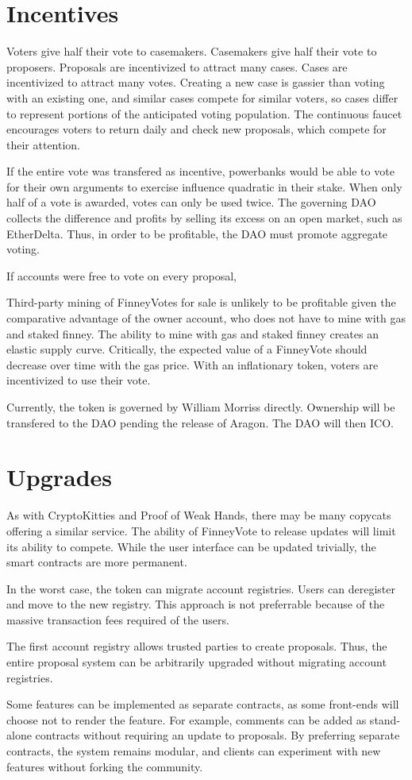 \documentclass{article}
\begin{document}
\section{Incentives}
Voters give half their vote to casemakers.
Casemakers give half their vote to proposers.
Proposals are incentivized to attract many cases.
Cases are incentivized to attract many votes.
Creating a new case is gassier than voting with an existing one, and similar cases compete for similar voters, so cases differ to represent portions of the anticipated voting population.
The continuous faucet encourages voters to return daily and check new proposals, which compete for their attention.
\par
If the entire vote was transfered as incentive, powerbanks would be able to vote for their own arguments to exercise influence quadratic in their stake.
When only half of a vote is awarded, votes can only be used twice.
The governing DAO collects the difference and profits by selling its excess on an open market, such as EtherDelta.
Thus, in order to be profitable, the DAO must promote aggregate voting.
\par
If accounts were free to vote on every proposal, 
\par
Third-party mining of FinneyVotes for sale is unlikely to be profitable given the comparative advantage of the owner account, who does not have to mine with gas and staked finney.
The ability to mine with gas and staked finney creates an elastic supply curve.
Critically, the expected value of a FinneyVote should decrease over time with the gas price.
With an inflationary token, voters are incentivized to use their vote.
\par
Currently, the token is governed by William Morriss directly.
Ownership will be transfered to the DAO pending the release of Aragon.
The DAO will then ICO.
\section{Upgrades}
As with CryptoKitties and Proof of Weak Hands, there may be many copycats offering a similar service.
The ability of FinneyVote to release updates will limit its ability to compete.
While the user interface can be updated trivially, the smart contracts are more permanent.
\par
In the worst case, the token can migrate account registries.
Users can deregister and move to the new registry.
This approach is not preferrable because of the massive transaction fees required of the users.
\par
The first account registry allows trusted parties to create proposals.
Thus, the entire proposal system can be arbitrarily upgraded without migrating account registries.
\par
Some features can be implemented as separate contracts, as some front-ends will choose not to render the feature.
For example, comments can be added as stand-alone contracts without requiring an update to proposals.
By preferring separate contracts, the system remains modular, and clients can experiment with new features without forking the community.
\end{document}
